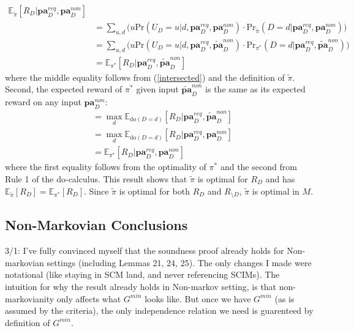 \documentclass[letterpaper,10pt]{article}
\begin{document}
\begin{align*}
\mathbb{E}_{\tilde{\pi}} [R_{D}|\mathbf{pa}_D^{req},\mathbf{pa}^{non}_D] \\
&= \sum_{u,d}\big(u\text{Pr}(U_D=u|d,\mathbf{pa}_D^{req},\mathbf{pa}^{non}_D) 
\cdot \text{Pr}_{\tilde{\pi}} (D=d|\mathbf{pa}_D^{req},\mathbf{pa}^{non}_D) \big)\\
&= \sum_{u,d}\big(u\text{Pr}(U_D=u|d,\mathbf{pa}_D^{req},\mathbf{\tilde{pa}}^{non}_D) 
\cdot \text{Pr}_{\pi^*} (D=d|\mathbf{pa}_D^{req},\mathbf{\tilde{pa}}^{non}_D) \big)\\
&= \mathbb{E}_{\pi^*} [R_{D}|\mathbf{pa}_D^{req},\mathbf{\tilde{pa}}^{non}_D]
\end{align*}
where the middle equality follows from (\ref{intersected}) and the definition of $\tilde{\pi}$. 
Second, the expected reward of $\pi^*$ given input $\mathbf{\tilde{pa}}^{non}_D$ is the same as its expected reward on any input $\mathbf{pa}^{non}_D$:
\begin{align*}
&= \max_{d} \mathbb{E}_{\text{do}(D=d)} [R_{D}|\mathbf{pa}_D^{req},\mathbf{\tilde{pa}}^{non}_D] \\
&= \max_{d} \mathbb{E}_{\text{do}(D=d)} [R_{D}|\mathbf{pa}_D^{req},\mathbf{pa}^{non}_D] \\
&= \mathbb{E}_{\pi^*} [R_{D}|\mathbf{pa}_D^{req},\mathbf{pa}^{non}_D]
\end{align*}
where the first equality follows from the optimality of $\pi^*$ and the second from Rule 1 of the do-calculus. 
This result shows that $\tilde{\pi}$ is optimal for $R_D$ and has $\mathbb{E}_{\tilde{\pi}} [R_{D}]=\mathbb{E}_{\pi^*} [R_{D}]$.
Since $\tilde{\pi}$ is optimal for both $R_D$ and $R_{\setminus D}$, $\tilde{\pi}$ is optimal in $M$.



\subsection{Non-Markovian Conclusions}
3/1: I've fully convinced myself that the soundness proof already holds for Non-markovian settings (including Lemmas 21, 24, 25). The only changes I made were notational (like staying in SCM land, and never referencing SCIMs). The intuition for why the result already holds in Non-markov setting, is that non-markovianity only affects what $G^{min}$ looks like. But once we have $G^{min}$ (as is assumed by the criteria), the only independence relation we need is guarenteed by definition of $G^{min}$. 
\end{document}
